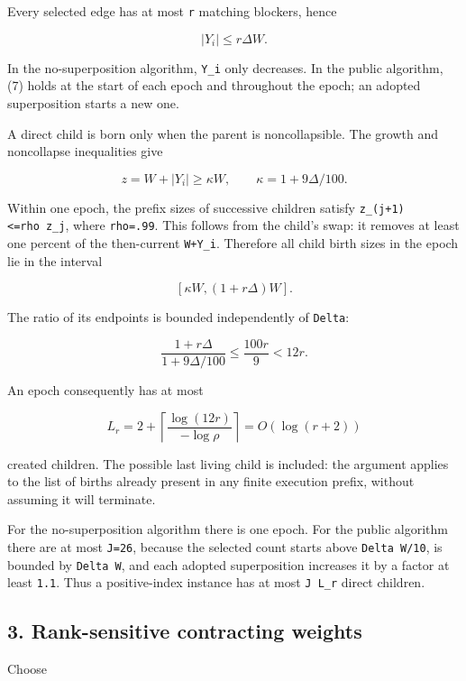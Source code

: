Every selected edge has at most \texttt{r} matching blockers, hence

\[
|Y_i|\le r\Delta W.
 \tag{7}
\]

In the no-superposition algorithm, \texttt{Y\_i} only decreases. In the public algorithm, (7) holds at the start of each epoch and throughout the epoch; an adopted superposition starts a new one.

A direct child is born only when the parent is noncollapsible. The growth and noncollapse inequalities give

\[
z=W+|Y_i|\ge\kappa W,
 \qquad\kappa=1+9\Delta/100.
 \tag{8}
\]

Within one epoch, the prefix sizes of successive children satisfy \texttt{z\_(j+1)\textless{}=rho\ z\_j}, where \texttt{rho=.99}. This follows from the child's swap: it removes at least one percent of the then-current \texttt{W+\textbar{}Y\_i\textbar{}}. Therefore all child birth sizes in the epoch lie in the interval

\[
[\kappa W,(1+r\Delta)W].
\]

The ratio of its endpoints is bounded independently of \texttt{Delta}:

\[
\frac{1+r\Delta}{1+9\Delta/100}
                   \le\frac{100r}{9}<12r.
 \tag{9}
\]

An epoch consequently has at most

\[
L_r=2+\left\lceil\frac{\log(12r)}{-\log\rho}\right\rceil
        =O(\log(r+2))
 \tag{10}
\]

created children. The possible last living child is included: the argument applies to the list of births already present in any finite execution prefix, without assuming it will terminate.

For the no-superposition algorithm there is one epoch. For the public algorithm there are at most \texttt{J=26}, because the selected count starts above \texttt{Delta\ W/10}, is bounded by \texttt{Delta\ W}, and each adopted superposition increases it by a factor at least \texttt{1.1}. Thus a positive-index instance has at most \texttt{J\ L\_r} direct children.

\hypertarget{af-6a8212874a-rank-sensitive-contracting-weights}{%
\subsection{3. Rank-sensitive contracting weights}\label{af-6a8212874a-rank-sensitive-contracting-weights}}

Choose

